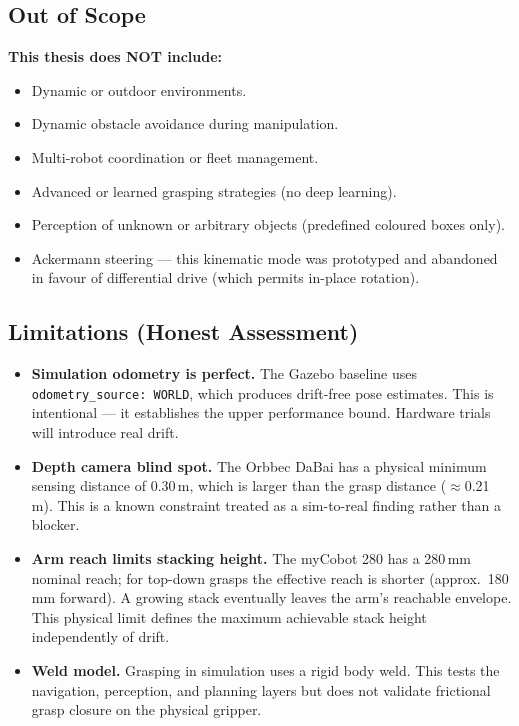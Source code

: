 \documentclass[11pt,a4paper]{article}
\begin{document}
\subsection{Out of Scope}
\begin{tcolorbox}[colback=boxbg, colframe=accent, arc=3pt, boxrule=1pt,
    left=1em, right=1em, top=0.5em, bottom=0.5em]
    \textbf{This thesis does NOT include:}
    \begin{itemize}[label=\textbullet, leftmargin=1em, topsep=0.2em, itemsep=0.2em]
        \item Dynamic or outdoor environments.
        \item Dynamic obstacle avoidance during manipulation.
        \item Multi-robot coordination or fleet management.
        \item Advanced or learned grasping strategies (no deep learning).
        \item Perception of unknown or arbitrary objects (predefined coloured boxes only).
        \item Ackermann steering --- this kinematic mode was prototyped and abandoned
        in favour of differential drive (which permits in-place rotation).
    \end{itemize}
\end{tcolorbox}

\subsection{Limitations (Honest Assessment)}
\begin{itemize}[label=\textbullet, leftmargin=1.5em]
    \item \textbf{Simulation odometry is perfect.} The Gazebo baseline uses
    \texttt{odometry\_source: WORLD}, which produces drift-free pose estimates. This is
    intentional --- it establishes the upper performance bound. Hardware trials will
    introduce real drift.
    \item \textbf{Depth camera blind spot.} The Orbbec DaBai has a physical minimum
    sensing distance of 0.30\,m, which is larger than the grasp distance
    ($\approx$0.21\,m). This is a known constraint treated as a sim-to-real finding
    rather than a blocker.
    \item \textbf{Arm reach limits stacking height.} The myCobot 280 has a 280\,mm
    nominal reach; for top-down grasps the effective reach is shorter
    (approx.\ 180\,mm forward). A growing stack eventually leaves the arm's reachable
    envelope. This physical limit defines the maximum achievable stack height
    independently of drift.
    \item \textbf{Weld model.} Grasping in simulation uses a rigid body weld. This
    tests the navigation, perception, and planning layers but does not validate frictional
    grasp closure on the physical gripper.
\end{itemize}
\end{document}

